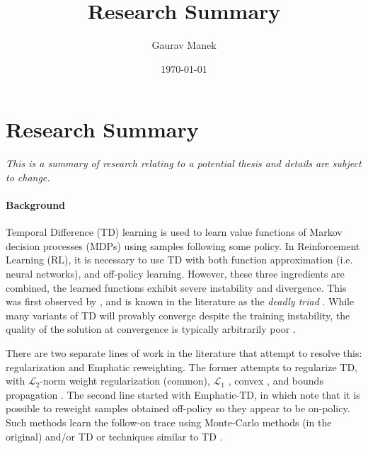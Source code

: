 \documentclass[11pt]{article}
\title{ Research Summary }
\author{ Gaurav Manek }
\date{\today}
\begin{document}
\pagebreak

\section*{Research Summary}
\emph{This is a summary of research relating to a potential thesis and details are subject to change. }

\paragraph{Background} Temporal Difference (TD) learning is used to learn value functions of Markov decision processes (MDPs) using samples following some policy. In Reinforcement Learning (RL), it is necessary to use TD with both function approximation (i.e. neural networks), and off-policy learning. However, these three ingredients are combined, the learned functions exhibit severe instability and divergence. This was first observed by \citet{tsitsiklis1996analysis}, and is known in the literature as the \emph{deadly triad} \cite[p.~264]{sutton2020reinforcement}. While many variants of TD will provably converge despite the training instability, the quality of the solution at convergence is typically arbitrarily poor \citep{kolter2011fixed}.

There are two separate lines of work in the literature that attempt to resolve this: regularization and Emphatic reweighting.
The former attempts to regularize TD, with $\mathcal L_2$-norm weight regularization (common), $\mathcal L_1$ \citep{mahadevan2014proximal}, convex \citep{yu2017convergence}, and bounds propagation \citep{kumar2020discor}.
The second line started with Emphatic-TD, in which \citet{sutton2016emphatic} note that it is possible to reweight samples obtained off-policy so they appear to be on-policy. Such methods learn the follow-on trace using Monte-Carlo methods (in the original) and/or TD \citep{jiang2021learning,zhang2020provably} or techniques similar to TD \citep{hasselt2021expected}.
\end{document}
